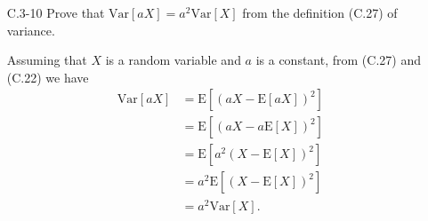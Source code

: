 \documentclass{report}
\makeatletter
\renewenvironment{framed}{%
 \def\FrameCommand##1{\hskip\@totalleftmargin
 \fboxsep=\FrameSep\fbox{##1}}%
 \MakeFramed {\advance\hsize-\width
   \@totalleftmargin\z@ \linewidth\hsize
   \@setminipage}}%
 {\par\unskip\endMakeFramed}
\makeatother
\begin{document}
\begin{enumerate}
\item[C.3{-}10]{Prove that $\text{Var}[aX] = a^2 \text{Var}[X]$ from the
definition (C.27) of variance.}

\begin{framed}
Assuming that $X$ is a random variable and $a$ is a constant, from (C.27) and
(C.22) we have
\begin{equation*}
\begin{aligned}
  \text{Var}[a X] &= \text{E}[(a X - \text{E}[a X])^2]\\
                  &= \text{E}[(a X - a \text{E}[X])^2]\\
                  &= \text{E}[a^2 (X - \text{E}[X])^2]\\
                  &= a^2 \text{E}[(X - \text{E}[X])^2]\\
                  &= a^2 \text{Var}[X].
\end{aligned}
\end{equation*}
\end{framed}

\end{enumerate}
\end{document}
